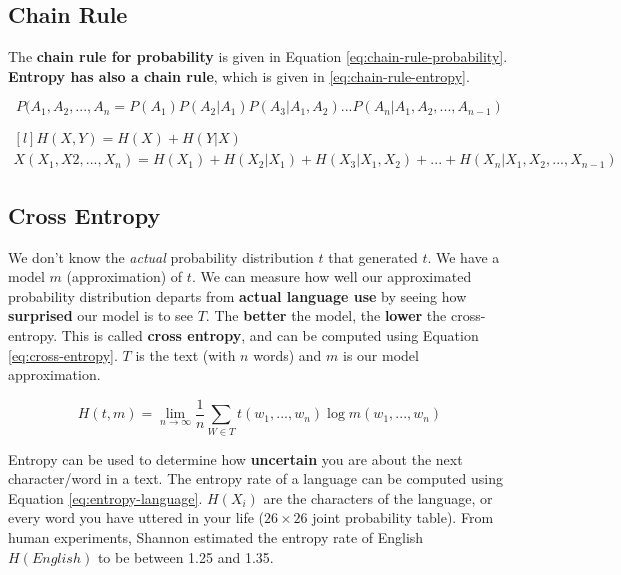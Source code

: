 \documentclass{article}
\begin{document}
\subsection{Chain Rule}

The \textbf{chain rule for probability} is given in Equation \ref{eq:chain-rule-probability}. \textbf{Entropy has also a chain rule}, which is given in \ref{eq:chain-rule-entropy}.

\begin{equation}
	P(A_1,A_2,...,A_n = P(A_1)P(A_2|A_1)P(A_3|A_1,A_2)...P(A_n|A_1,A_2,...,A_{n-1})
	\label{eq:chain-rule-probability}
\end{equation}

\begin{equation}
\begin{aligned}[l]
	H(X,Y) = H(X) + H(Y|X) \\
	X(X_1,X2,...,X_n) = H(X_1) + H(X_2|X_1) +  H(X_3|X_1,X_2) + ... + H(X_n|X_1,X_2,...,X_{n-1})
	\end{aligned}
	\label{eq:chain-rule-entropy}
\end{equation}

\subsection{Cross Entropy}

We don't know the \textit{actual} probability distribution $t$ that generated $t$. We have a model $m$ (approximation) of $t$. We can measure how well our approximated probability distribution departs from \textbf{actual language use} by seeing how \textbf{surprised} our model is to see $T$. The \textbf{better} the model, the \textbf{lower} the cross-entropy. This is called \textbf{cross entropy}, and can be computed using Equation \ref{eq:cross-entropy}. $T$ is the text (with $n$ words) and $m$ is our model approximation.

\begin{equation}
	H(t,m) = \lim_{n \rightarrow \infty} \frac{1}{n} \sum_{W \in T} t(w_1,...,w_n) \log m(w_1, ..., w_n)
	\label{eq:cross-entropy}	
\end{equation}

Entropy can be used to determine how \textbf{uncertain} you are about the next character/word in a text. The entropy rate of a language can be computed using Equation \ref{eq:entropy-language}. $H(X_i)$ are the characters of the language, or every word you have uttered in your life ($26 \times 26$ joint probability table). From human experiments, Shannon estimated the entropy rate of English $H(English)$ to be between 1.25 and 1.35.
\end{document}
